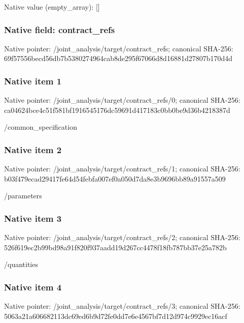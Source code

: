 \documentclass[10pt,a4paper]{article}
\begin{document}
Native value (empty\_\allowbreak{}array): []

\subsubsection{Native field: contract\_\allowbreak{}refs}
Native pointer: /joint\_\allowbreak{}analysis/target/contract\_\allowbreak{}refs; canonical SHA-256: 69f57556becd56db7b5380274964cab8de295f67066d8d16881d27807b170d4d

\subsubsection{Native item 1}
Native pointer: /joint\_\allowbreak{}analysis/target/contract\_\allowbreak{}refs/0; canonical SHA-256: ca04624bce4c51f581bf1916545176dc59691d417183c0bb0be9d36b4218387d

\begingroup\raggedright\sloppy /\allowbreak{}common\_\allowbreak{}specification\par\endgroup

\subsubsection{Native item 2}
Native pointer: /joint\_\allowbreak{}analysis/target/contract\_\allowbreak{}refs/1; canonical SHA-256: b03f479ecad29417fe64d54febfa007ef0a050d7da8e3b9696bb89a91557a509

\begingroup\raggedright\sloppy /\allowbreak{}parameters\par\endgroup

\subsubsection{Native item 3}
Native pointer: /joint\_\allowbreak{}analysis/target/contract\_\allowbreak{}refs/2; canonical SHA-256: 526f619ec2b99bd98a91f820f937aadd19d267cc4478f18fb787bb37e25a782b

\begingroup\raggedright\sloppy /\allowbreak{}quantities\par\endgroup

\subsubsection{Native item 4}
Native pointer: /joint\_\allowbreak{}analysis/target/contract\_\allowbreak{}refs/3; canonical SHA-256: 5063a21a606682113dc69ed6b9d72fe0dd7e6e4567bf7d12d974c9929ec16acf
\end{document}
